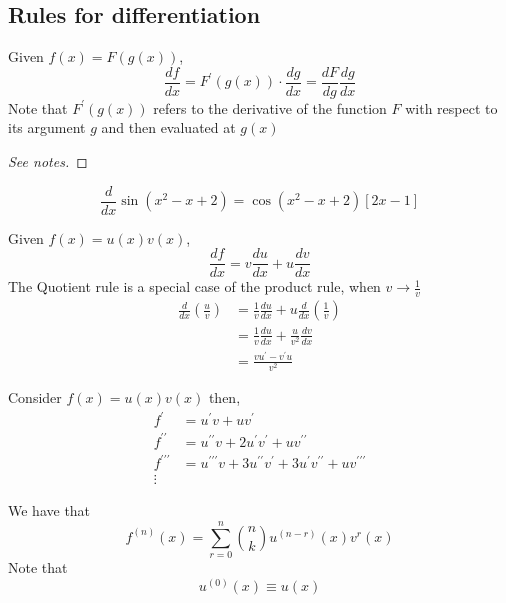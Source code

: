 \documentclass{article}
\begin{document}
\subsection{Rules for differentiation}
\begin{thm}
    Given $f(x) = F(g(x))$,
    \[
        \frac{df}{dx} = F^{\prime}(g(x)) \cdot \frac{dg}{dx}   = \frac{dF}{dg}\frac{dg}{dx}
    \]
    Note that $F^{\prime}(g(x))$ refers to the derivative of the function $F$ with respect to its argument $g$ and then evaluated at $g(x)$
\end{thm}

\begin{proof}[See notes]
    
\end{proof}

\begin{eg}
    \[
        \frac{d}{dx} \sin{(x^2 -x +2)} = \cos{(x^2 -x +2)}[2x - 1]
    \]
\end{eg}

\begin{thm}
    Given $f(x) = u(x)v(x)$,
    \[
        \frac{df}{dx} = v \frac{du}{dx} + u \frac{dv}{dx}
    \]
    The Quotient rule is a special case of the product rule, when $v \rightarrow \frac{1}{v}$
    \begin{align*}
        \frac{d}{dx}\left(\frac{u}{v}\right) &= \frac{1}{v}\frac{du}{dx} + u \frac{d}{dx}\left(\frac{1}{v}\right) \\
        &= \frac{1}{v}\frac{du}{dx} + \frac{u}{v^2} \frac{dv}{dx} \\
        &= \frac{vu^{\prime} - v^{\prime}u}{v^2}
    \end{align*}
\end{thm}

\begin{thm}
    Consider $f(x) = u(x)v(x)$ then,
    \begin{align*}
        f^{\prime} &= u^{\prime}v + uv^{\prime} \\
        f^{\prime\prime} &= u^{\prime\prime}v + 2u^{\prime}v^{\prime} + uv^{\prime\prime} \\
        f^{\prime\prime\prime} &= u^{\prime\prime\prime}v + 3u^{\prime\prime}v^{\prime} + 3u^{\prime}v^{\prime\prime} + uv^{\prime\prime\prime} \\
        \vdots
    \end{align*}

    We have that
    \[
        f^{(n)}(x) = \sum_{r=0}^{n}{\binom{n}{k}u^{(n-r)}(x)v^{r}(x)}
    \]
    Note that
    \[
        u^{(0)}(x) \equiv u(x)  
    \]
\end{thm}
\end{document}
